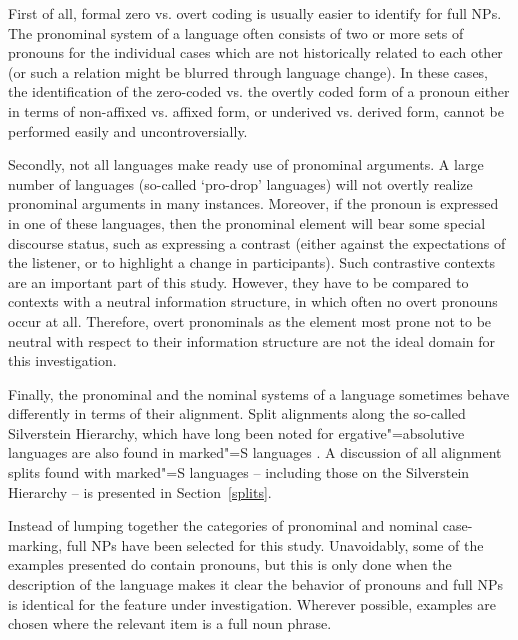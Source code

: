 First of all, formal zero vs. overt coding is usually easier to identify for full NPs. 
The pronominal system of a language often consists of two or more sets of pronouns for the individual cases which are not historically related to each other (or such a relation might be blurred through language change). 
In these cases, the identification of the zero-coded vs. the overtly coded form of a pronoun either in terms of non-affixed vs. affixed form, or underived vs. derived form, cannot be performed easily and uncontroversially.  

Secondly, not all languages make ready use of pronominal arguments. 
A large number of languages (so-called `pro-drop' languages) will not overtly realize pronominal arguments in many instances. 
Moreover, if the pronoun is expressed in one of these languages, then the pronominal element will bear some special discourse status, such as expressing a contrast (either against the expectations of the listener, or to highlight a change in participants). 
Such contrastive contexts are an important part of this study. 
However, they have to be compared to contexts with a neutral information structure, in which often no overt pronouns occur at all. 
Therefore, overt pronominals as the element most prone not to be neutral with respect to their information structure are not the ideal domain for this investigation.

Finally, the pronominal and the nominal systems of a language sometimes behave differently in terms of their alignment. 
Split alignments along the so-called Silverstein Hierarchy, which have long been noted for ergative"=absolutive languages \citep{Silverstein:1976,Dixon:1994} are also found in marked"=S languages \citep{Handschuh:2008,Handschuh:2014}. 
A discussion of all alignment splits found with marked"=S languages -- including those on the Silverstein Hierarchy -- is presented in Section~\ref{splits}. 

Instead of lumping together the categories of pronominal and nominal case-marking, full NPs have been selected for this study.    
Unavoidably, some of the examples presented do contain pronouns, but this is only done when the description of the language makes it clear the behavior of pronouns and full NPs is identical for the feature under investigation. 
Wherever possible, examples are chosen where the relevant item is a full noun phrase.



